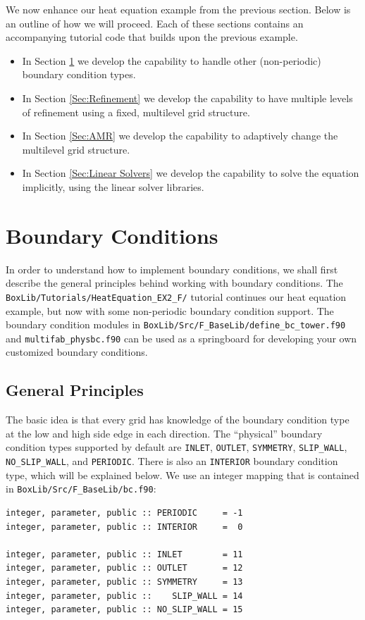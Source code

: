 We now enhance our heat equation example from the previous section.
Below is an outline of how we will proceed.  Each of these sections contains an 
accompanying tutorial code that builds upon the previous example.
\begin{itemize}

\item In Section \ref{Sec:Boundary Conditions} we develop the capability to handle
other (non-periodic) boundary condition types.

\item In Section \ref{Sec:Refinement} we develop the capability to have multiple
levels of refinement using a fixed, multilevel grid structure.

\item In Section \ref{Sec:AMR} we develop the capability to adaptively change the
multilevel grid structure.

\item In Section \ref{Sec:Linear Solvers} we develop the capability to solve the
equation implicitly, using the linear solver libraries.

\end{itemize}

\section{Boundary Conditions}\label{Sec:Boundary Conditions}
In order to understand how to implement boundary conditions, we shall 
first describe the general principles behind working with boundary conditions.
The {\tt BoxLib/Tutorials/HeatEquation\_EX2\_F/} tutorial continues our heat
equation example, but now with some non-periodic boundary condition support.  The boundary
condition modules in {\tt BoxLib/Src/F\_BaseLib/define\_bc\_tower.f90} and {\tt multifab\_physbc.f90} 
can be used as a springboard for developing your own customized boundary conditions.

\subsection{General Principles}
The basic idea is that every grid has knowledge of the
boundary condition type at the low and high side edge in each direction.
The ``physical'' boundary condition types supported by default are {\tt INLET}, {\tt OUTLET},
{\tt SYMMETRY}, {\tt SLIP\_WALL}, {\tt NO\_SLIP\_WALL}, and {\tt PERIODIC}.
There is also an {\tt INTERIOR} boundary condition type, which 
will be explained below.  We use an integer mapping that is 
contained in {\tt BoxLib/Src/F\_BaseLib/bc.f90}:
\begin{lstlisting}[backgroundcolor=\color{light-green}]
integer, parameter, public :: PERIODIC     = -1
integer, parameter, public :: INTERIOR     =  0

integer, parameter, public :: INLET        = 11
integer, parameter, public :: OUTLET       = 12
integer, parameter, public :: SYMMETRY     = 13
integer, parameter, public ::    SLIP_WALL = 14
integer, parameter, public :: NO_SLIP_WALL = 15
\end{lstlisting}

